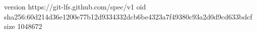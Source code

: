 version https://git-lfs.github.com/spec/v1
oid sha256:60d214d36e1200e77b12d9334332dcb6be4323a7f49380c93a2d0d9cd633bdcf
size 1048672

